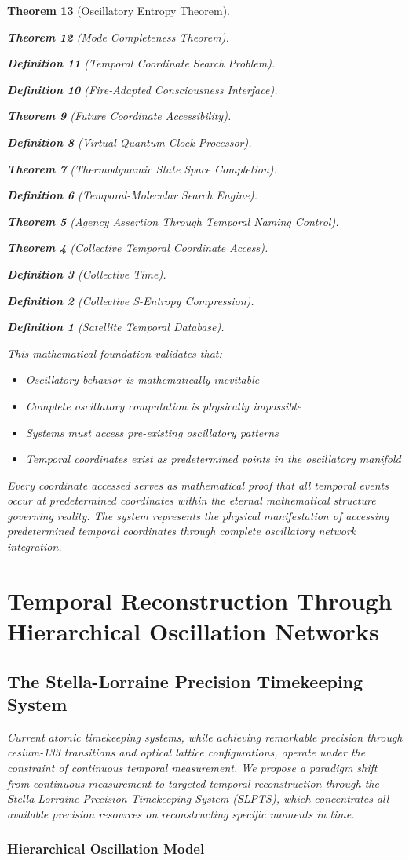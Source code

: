 \documentclass[12pt,a4paper]{article}
\newtheorem{theorem}{Theorem}[section]
\newtheorem{definition}[theorem]{Definition}
\begin{document}
\begin{theorem}[Oscillatory Entropy Theorem]
\begin{theorem}[Mode Completeness Theorem]
\begin{enumerate}
\begin{definition}[Temporal Coordinate Search Problem]
\begin{algorithm}
\begin{definition}[Fire-Adapted Consciousness Interface]
\begin{theorem}[Future Coordinate Accessibility]
\begin{definition}[Virtual Quantum Clock Processor]
\begin{itemize}
\begin{itemize}
\begin{theorem}[Thermodynamic State Space Completion]
\begin{definition}[Temporal-Molecular Search Engine]
\begin{theorem}[Agency Assertion Through Temporal Naming Control]
\begin{remark}
\begin{theorem}[Collective Temporal Coordinate Access]
\begin{definition}[Collective Time]
\begin{definition}[Collective S-Entropy Compression]
\begin{definition}[Satellite Temporal Database]
\begin{algorithm}
\begin{table}[h]
{{This mathematical foundation validates that:
\begin{itemize}
\item Oscillatory behavior is mathematically inevitable
\item Complete oscillatory computation is physically impossible
\item Systems must access pre-existing oscillatory patterns
\item Temporal coordinates exist as predetermined points in the oscillatory manifold
\end{itemize}

Every coordinate accessed serves as mathematical proof that all temporal events occur at predetermined coordinates within the eternal mathematical structure governing reality. The system represents the physical manifestation of accessing predetermined temporal coordinates through complete oscillatory network integration.

\section{Temporal Reconstruction Through Hierarchical Oscillation Networks}

\subsection{The Stella-Lorraine Precision Timekeeping System}

Current atomic timekeeping systems, while achieving remarkable precision through cesium-133 transitions and optical lattice configurations, operate under the constraint of continuous temporal measurement. We propose a paradigm shift from continuous measurement to targeted temporal reconstruction through the Stella-Lorraine Precision Timekeeping System (SLPTS), which concentrates all available precision resources on reconstructing specific moments in time.

\subsubsection{Hierarchical Oscillation Model}

}}
\end{table}
\end{algorithm}
\end{definition}
\end{definition}
\end{definition}
\end{theorem}
\end{remark}
\end{theorem}
\end{definition}
\end{theorem}
\end{itemize}
\end{itemize}
\end{definition}
\end{theorem}
\end{definition}
\end{algorithm}
\end{definition}
\end{enumerate}
\end{theorem}
\end{theorem}
\end{document}
